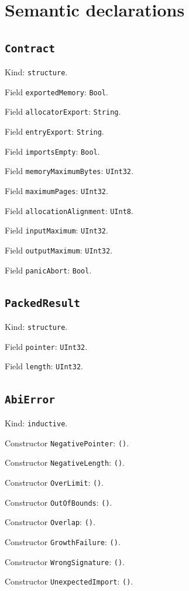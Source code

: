 \documentclass[11pt]{article}
\begin{document}
\section*{Semantic declarations}
\subsection*{\texttt{Contract}}
\noindent Kind: \texttt{structure}.\par
\noindent Field \texttt{exportedMemory}: \texttt{Bool}.\par
\noindent Field \texttt{allocatorExport}: \texttt{String}.\par
\noindent Field \texttt{entryExport}: \texttt{String}.\par
\noindent Field \texttt{importsEmpty}: \texttt{Bool}.\par
\noindent Field \texttt{memoryMaximumBytes}: \texttt{UInt32}.\par
\noindent Field \texttt{maximumPages}: \texttt{UInt32}.\par
\noindent Field \texttt{allocationAlignment}: \texttt{UInt8}.\par
\noindent Field \texttt{inputMaximum}: \texttt{UInt32}.\par
\noindent Field \texttt{outputMaximum}: \texttt{UInt32}.\par
\noindent Field \texttt{panicAbort}: \texttt{Bool}.\par
\subsection*{\texttt{PackedResult}}
\noindent Kind: \texttt{structure}.\par
\noindent Field \texttt{pointer}: \texttt{UInt32}.\par
\noindent Field \texttt{length}: \texttt{UInt32}.\par
\subsection*{\texttt{AbiError}}
\noindent Kind: \texttt{inductive}.\par
\noindent Constructor \texttt{NegativePointer}: \texttt{()}.\par
\noindent Constructor \texttt{NegativeLength}: \texttt{()}.\par
\noindent Constructor \texttt{OverLimit}: \texttt{()}.\par
\noindent Constructor \texttt{OutOfBounds}: \texttt{()}.\par
\noindent Constructor \texttt{Overlap}: \texttt{()}.\par
\noindent Constructor \texttt{GrowthFailure}: \texttt{()}.\par
\noindent Constructor \texttt{WrongSignature}: \texttt{()}.\par
\noindent Constructor \texttt{UnexpectedImport}: \texttt{()}.\par
\end{document}
